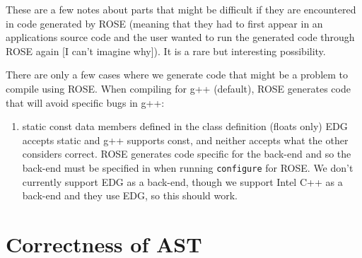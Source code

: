     These are a few notes about parts that might be difficult if they are 
encountered in code generated by ROSE (meaning that they had to first appear in 
an applications source code and the user wanted to run the generated code through ROSE
again [I can't imagine why]).  It is a rare but interesting possibility.

   There are only a few cases where we generate code that might be a problem to compile
using ROSE. When compiling for g++ (default), ROSE generates code that will avoid specific
bugs in g++:
\begin{enumerate}
   \item static const data members defined in the class definition (floats only)
         EDG accepts static and g++ supports const, and neither accepts what the other
         considers correct. ROSE generates code specific for the back-end and so the
         back-end must be specified in when running {\tt configure} for ROSE.  We
         don't currently support EDG as a back-end, though we support Intel C++ as a
         back-end and they use EDG, so this should work.
\end{enumerate}


\section{Correctness of AST}

